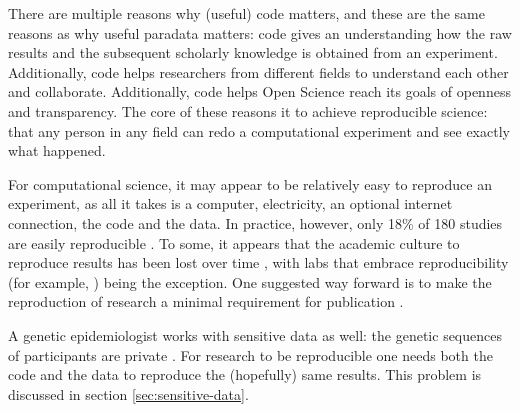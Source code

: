 
There are multiple reasons why (useful) code matters,
and these are the same reasons as why useful paradata matters:
code gives an understanding how the raw results 
and the subsequent scholarly knowledge is obtained from an experiment.
Additionally, code helps researchers from different fields 
to understand each other and collaborate.
Additionally, code helps Open Science reach its goals of openness and
transparency.
The core of these reasons it to achieve reproducible science:
that any person in any field can redo a computational experiment
and see exactly what happened.


For computational science, it may appear to be relatively easy to 
reproduce an experiment, as all it takes is a computer, electricity,
an optional internet connection, the code and the data.
In practice, however, 
only 18\% of 180 studies are easily reproducible \cite{stodden2018empirical}.
To some, it appears that 
the academic culture to reproduce results 
has been lost over time \cite{peng2011reproducible},
with labs that embrace reproducibility (for example, \cite{barba2016hard})
being the exception.
One suggested way forward is to make the reproduction of 
research a minimal requirement for publication \cite{peng2011reproducible}.


A genetic epidemiologist works with sensitive data as well:
the genetic sequences of participants are private \cite{clayton2019law}.
For research to be reproducible one needs both the code and the data
to reproduce the (hopefully) same results.
This problem is discussed in section \ref{sec:sensitive-data}.


